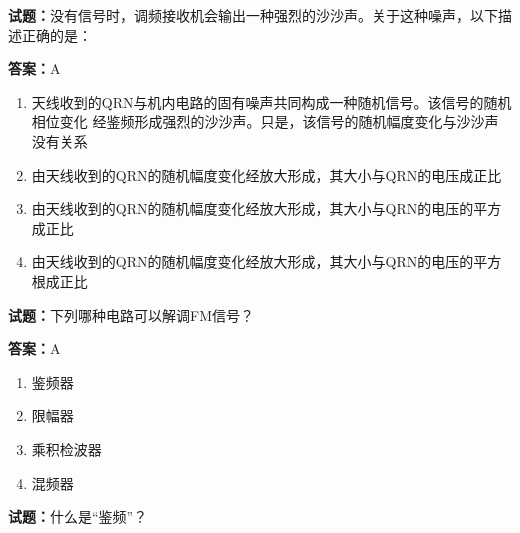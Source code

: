 \documentclass{ctexbook}
\begin{document}




\vspace{1em}

\textbf{试题：}没有信号时，调频接收机会输出一种强烈的沙沙声。关于这种噪声，以下描述正确的是： 

\textbf{答案：}A 

\begin{enumerate}[leftmargin=3em]
  \item 天线收到的QRN与机内电路的固有噪声共同构成一种随机信号。该信号的随机相位变化
经鉴频形成强烈的沙沙声。只是，该信号的随机幅度变化与沙沙声没有关系 

  \item 由天线收到的QRN的随机幅度变化经放大形成，其大小与QRN的电压成正比 

  \item 由天线收到的QRN的随机幅度变化经放大形成，其大小与QRN的电压的平方成正比 

  \item 由天线收到的QRN的随机幅度变化经放大形成，其大小与QRN的电压的平方根成正比 

\end{enumerate}





\vspace{1em}

\textbf{试题：}下列哪种电路可以解调FM信号？ 

\textbf{答案：}A 

\begin{enumerate}[leftmargin=3em]
  \item 鉴频器 

  \item 限幅器 

  \item 乘积检波器 

  \item 混频器 

\end{enumerate}






\vspace{1em}

\textbf{试题：}什么是“鉴频”？ 
\end{document}
